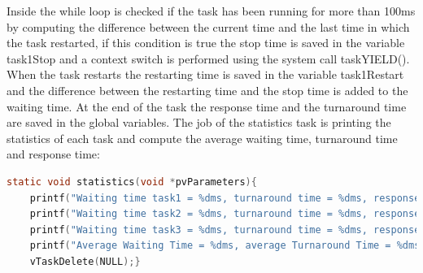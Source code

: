 \documentclass[9pt, reqno]{amsart}
\theoremstyle{definition}
\theoremstyle{remark}
\numberwithin{equation}{section}
\begin{document}
{Inside the while loop is checked if the task has been running for more than 100ms by computing the difference between the current time and the last time in which the task restarted, if this condition is true the stop time is saved in the variable task1Stop and a context switch is performed using the system call taskYIELD(). When the task restarts the restarting time is saved in the variable task1Restart and the difference between the restarting time and the stop time is added to the waiting time.
At the end of the task the response time and the turnaround time are saved in the global variables.
The job of the statistics task is printing the statistics of each task and compute the average waiting time, turnaround time and response time:
\begin{lstlisting}[breaklines=true, basicstyle=\bfseries,language=c,basicstyle=\small]
static void statistics(void *pvParameters){     
    printf("Waiting time task1 = %dms, turnaround time = %dms, response time = %dms\n", pdTICKS_TO_MS(wt1_rr), pdTICKS_TO_MS(tt1_rr), pdTICKS_TO_MS(rt1_rr));
    printf("Waiting time task2 = %dms, turnaround time = %dms, response time = %dms\n", pdTICKS_TO_MS(wt2_rr), pdTICKS_TO_MS(tt2_rr), pdTICKS_TO_MS(rt2_rr));
    printf("Waiting time task3 = %dms, turnaround time = %dms, response time = %dms\n", pdTICKS_TO_MS(wt3_rr), pdTICKS_TO_MS(tt3_rr), pdTICKS_TO_MS(rt3_rr));
    printf("Average Waiting Time = %dms, average Turnaround Time = %dms, average Response Time = %dms\n", (wt1_rr+wt2_rr+wt3_rr)/3, (tt1_rr+tt2_rr+tt3_rr)/3, (rt1_rr+rt2_rr+rt3_rr)/3);
    vTaskDelete(NULL);}
\end{lstlisting}

}
\end{document}
